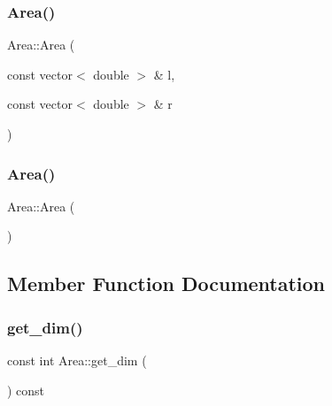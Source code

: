 \subsubsection{\texorpdfstring{Area()}{Area()}\hspace{0.1cm}{\footnotesize\ttfamily [1/2]}}
{\footnotesize\ttfamily Area\+::\+Area (\begin{DoxyParamCaption}\item[{const vector$<$ double $>$ \&}]{l,  }\item[{const vector$<$ double $>$ \&}]{r }\end{DoxyParamCaption})\hspace{0.3cm}{\ttfamily [inline]}}

\mbox{\label{class_area_aa92851fcffb0a9f1c6c8c283204f7003}} 
\subsubsection{\texorpdfstring{Area()}{Area()}\hspace{0.1cm}{\footnotesize\ttfamily [2/2]}}
{\footnotesize\ttfamily Area\+::\+Area (\begin{DoxyParamCaption}{ }\end{DoxyParamCaption})\hspace{0.3cm}{\ttfamily [inline]}}



\subsection{Member Function Documentation}
\mbox{\label{class_area_a1b288955abef67d9598b7321e8219ae8}} 
\subsubsection{\texorpdfstring{get\+\_\+dim()}{get\_dim()}}
{\footnotesize\ttfamily const int Area\+::get\+\_\+dim (\begin{DoxyParamCaption}{ }\end{DoxyParamCaption}) const}

\mbox{\label{class_area_af693a7f72a81522c495e5eef4296b6a9}} 
